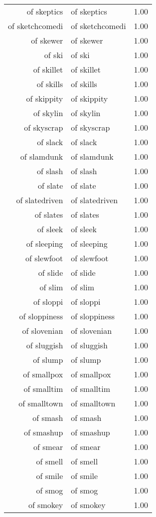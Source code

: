 \begin{table}[ht]
\begin{tabular}{rlr}
  of skeptics & of skeptics & 1.00 \\ 
  of sketchcomedi & of sketchcomedi & 1.00 \\ 
  of skewer & of skewer & 1.00 \\ 
  of ski & of ski & 1.00 \\ 
  of skillet & of skillet & 1.00 \\ 
  of skills & of skills & 1.00 \\ 
  of skippity & of skippity & 1.00 \\ 
  of skylin & of skylin & 1.00 \\ 
  of skyscrap & of skyscrap & 1.00 \\ 
  of slack & of slack & 1.00 \\ 
  of slamdunk & of slamdunk & 1.00 \\ 
  of slash & of slash & 1.00 \\ 
  of slate & of slate & 1.00 \\ 
  of slatedriven & of slatedriven & 1.00 \\ 
  of slates & of slates & 1.00 \\ 
  of sleek & of sleek & 1.00 \\ 
  of sleeping & of sleeping & 1.00 \\ 
  of slewfoot & of slewfoot & 1.00 \\ 
  of slide & of slide & 1.00 \\ 
  of slim & of slim & 1.00 \\ 
  of sloppi & of sloppi & 1.00 \\ 
  of sloppiness & of sloppiness & 1.00 \\ 
  of slovenian & of slovenian & 1.00 \\ 
  of sluggish & of sluggish & 1.00 \\ 
  of slump & of slump & 1.00 \\ 
  of smallpox & of smallpox & 1.00 \\ 
  of smalltim & of smalltim & 1.00 \\ 
  of smalltown & of smalltown & 1.00 \\ 
  of smash & of smash & 1.00 \\ 
  of smashup & of smashup & 1.00 \\ 
  of smear & of smear & 1.00 \\ 
  of smell & of smell & 1.00 \\ 
  of smile & of smile & 1.00 \\ 
  of smog & of smog & 1.00 \\ 
  of smokey & of smokey & 1.00 \\ 

\end{tabular}
\end{table}
